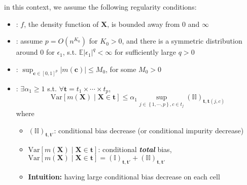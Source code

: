 \documentclass[twoside]{article}
\begin{document}
in this context, we assume the following regularity conditions:
\begin{itemize}
    \item {}: $f$, the density function of $\mathbf{X}$, is bounded away from $0$ and $\infty$
    \item {}: assume $p=O(n^{K_0})$ for $K_0>0$, and there is a symmetric distribution around $0$ for $\epsilon_1$, s.t. $\mathbb{E}\left\vert \epsilon_1 \right\vert^q < \infty$ for sufficiently large $q>0$
    \item {}: $\sup_{\mathbf{c}\in [0,1]^p}\left\vert m(\mathbf{c}) \right\vert \leq M_0$, for some $M_0>0$
    \item {}: $\exists \alpha_1\geq 1$ s.t. $\forall \mathbf{t} = t_1\times \cdots \times t_p$, $$ \mathrm{Var}\left[m(\mathbf{X})\mid \mathbf{X}\in\mathbf{t}\right] \leq \alpha_1 \sup_{j\in \left\{1,\cdots, p \right\}, c\in t_j} \left(\mathbb{II}\right)_{\mathbf{t,t}(j,c)}$$where 
    \begin{itemize}
        \item $\left( \mathbb{II} \right)_{\mathbf{t,t}'}$: conditional bias decrease (or conditional impurity decrease)
        \item $\mathrm{Var}\left[m(\mathbf{X})\mid \mathbf{X}\in\mathbf{t}\right]$: conditional \textbf{\textit{total}} bias, $\mathrm{Var}\left[m(\mathbf{X})\mid \mathbf{X}\in\mathbf{t}\right]= \left( \mathbb{I} \right)_{\mathbf{t,t}'}+\left( \mathbb{II} \right)_{\mathbf{t,t}'}$
        \item \textbf{Intuition:} having large conditional bias decrease on each cell
    \end{itemize}
\end{itemize}

\newpage


\end{document}
